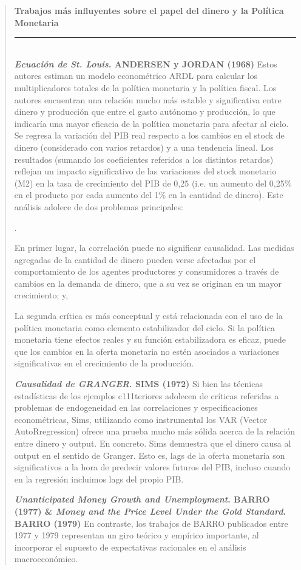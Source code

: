 \documentclass[10pt,a4paper]{article}
\newcounter{numitem}
\newenvironment{lnum}
      {\begin{list}{\arabic{numitem}.}{%
          \usecounter{numitem}%
          \setlength{\leftmargin}{1cm}%
          \setlength{\parskip}{3pt}%
          \setlength{\itemsep}{0pt}%
          \setlength{\parsep}{0pt}%
      }}
      {\end{list}}
\newenvironment{specialblock}[1]{%
      \begin{quote} %
      \small %
      \noindent\textbf{#1}\\[-0.3em] %
      \rule{\linewidth}{0.4pt}\\[0.6em]}{
      \end{quote}}
\begin{document}
\begin{specialblock}{Trabajos más influyentes sobre el papel del dinero y la Política Monetaria}
    \textbf{\textit{Ecuación de St. Louis}. ANDERSEN y JORDAN (1968)}
    Estos autores estiman un modelo econométrico ARDL para calcular los multiplicadores totales de la política monetaria y la política fiscal. Los autores encuentran una relación mucho más estable y significativa entre dinero y producción que entre el gasto autónomo y producción, lo que indicaría una mayor eficacia de la política monetaria para afectar al ciclo. Se regresa la variación del PIB real respecto a los cambios en el stock de dinero (considerado con varios retardos) y a una tendencia lineal. Los resultados (sumando los coeficientes referidos a los distintos retardos) reflejan un impacto significativo de las variaciones del stock monetario (M2) en la tasa de crecimiento del PIB de 0,25 (i.e. un aumento del 0,25\% en el producto por cada aumento del 1\% en la cantidad de dinero).
    Este análisis adolece de dos problemas principales:
    \begin{lnum}
        \item En primer lugar, la correlación puede no significar causalidad. Las medidas agregadas de la cantidad de dinero pueden verse afectadas por el comportamiento de los agentes productores y consumidores a través de cambios en la demanda de dinero, que a su vez se originan en un mayor crecimiento; y,
        \item La segunda crítica es más conceptual y está relacionada con el uso de la política monetaria como elemento estabilizador del ciclo. Si la política monetaria tiene efectos reales y su función estabilizadora es eficaz, puede que los cambios en la oferta monetaria no estén asociados a variaciones significativas en el crecimiento de la producción.
    \end{lnum}

    \textbf{\textit{Causalidad de GRANGER}. SIMS (1972)}
    Si bien las técnicas estadísticas de los ejemplos c111teriores adolecen de críticas referidas a problemas de endogeneidad en las correlaciones y especificaciones econométricas, Sims, utilizando como instrumental los VAR (Vector AutoRregression) ofrece una prueba mucho más sólida acerca de la relación entre dinero y output. En concreto. Sims demuestra que el dinero causa al output en el sentido de Granger. Esto es, lags de la oferta monetaria son significativos a la hora de predecir valores futuros del PIB, incluso cuando en la regresión incluimos lags del propio PIB.

    \textbf{\textit{Unanticipated Money Growth and Unemployment}. BARRO (1977) \& \textit{Money and the Price Level Under the Gold Standard}. BARRO (1979)}
    En contraste, los trabajos de BARRO publicados entre 1977 y 1979 representan un giro teórico y empírico importante, al incorporar el supuesto de expectativas racionales en el análisis macroeconómico. 
    

\end{specialblock}
\end{document}
